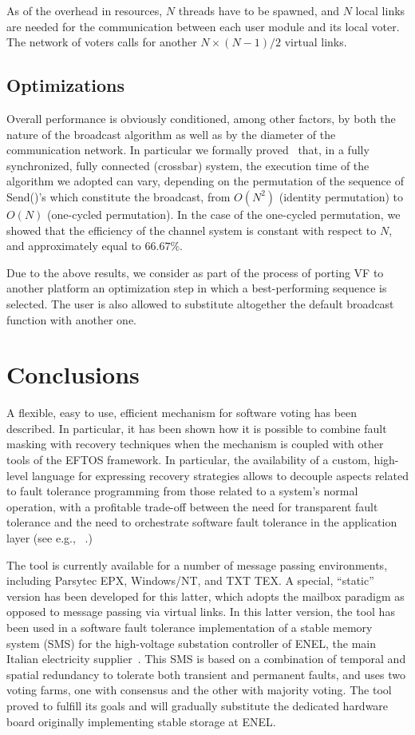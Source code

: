 \documentclass[11pt]{article}
\begin{document}
As of the overhead in resources, $N$ threads have to be spawned,
and $N$ local links are needed for the communication between each
user module and its local voter.
The network of voters calls for another 
$N\times(N-1)/2$ virtual links.

\subsection{Optimizations}
Overall performance is obviously conditioned, among other factors, by both the nature
of the broadcast algorithm as well as by the diameter
of the communication network. In particular we formally
proved~\cite{Pip} that, in a fully synchronized, fully connected (crossbar) system,
the execution time of the algorithm we adopted can vary,
depending on the permutation of the sequence of {\sf Send()}'s which constitute the
broadcast, from $O(N^2)$ (identity permutation)
to $O(N)$ (one-cycled permutation). In the case of the one-cycled permutation,
we showed that the efficiency of
the channel system is constant with respect to $N$, and approximately equal to $66.67\%$.

Due to the above results, we consider as part of the process of
porting VF to another platform
an optimization step in which a best-performing sequence
is selected. The user is also allowed
to substitute altogether the default broadcast function with another one.

\section{Conclusions}\label{end}
A flexible, easy to use, efficient mechanism for software voting 
has been described. In particular, it has been
shown how it is possible to combine fault masking with recovery techniques
when the mechanism is coupled with other tools of the EFTOS framework.
In particular, the availability of a custom, high-level language for
expressing recovery strategies allows to decouple aspects related
to fault tolerance programming from those related to a system's normal operation,
with a profitable trade-off between the need for transparent fault tolerance and
the need to orchestrate software fault tolerance in the application layer
(see e.g., ~\cite{HuKi93,Sal84}.)

The tool is currently available for a number of message passing environments, including
Parsytec EPX, Windows/NT, and TXT TEX.
A special, ``static'' version has been developed for this latter, which adopts
the mailbox paradigm as opposed to message passing via virtual links.
In this latter version, the tool has been used in a software fault tolerance 
implementation of a stable memory system (SMS) for the high-voltage substation 
controller of ENEL, the main Italian electricity supplier~\cite{DBCD98}.
This SMS is based on a combination of temporal and spatial redundancy
to tolerate both transient and permanent faults,
and uses two voting farms, one with consensus and the other with majority
voting. The tool proved to fulfill its goals and will gradually substitute
the dedicated hardware board originally implementing stable storage
at ENEL.
\end{document}
